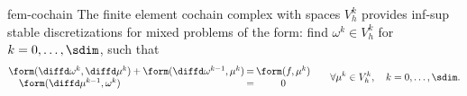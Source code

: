 \begin{Theorem}{fem-cochain}
  The finite element cochain complex with spaces $V_h^k$ provides
  inf-sup stable discretizations for mixed problems of the form: find
  $\omega^{k}\in V_h^k$ for $k=0,\dots,\sdim$, such that
  \begin{gather}
    \arraycolsep1pt
    \begin{matrix}
      \form(\diffd\omega^k,\diffd \mu^k)
      &+& \form(\diffd \omega^{k-1},\mu^k)
      &=& \form(f,\mu^k)\\
      \form(\diffd\mu^{k-1},\omega^k) &&&=&0
    \end{matrix}
    \qquad\forall \mu^k\in V_h^k, \quad k=0,\dots,\sdim.
  \end{gather}
\end{Theorem}



